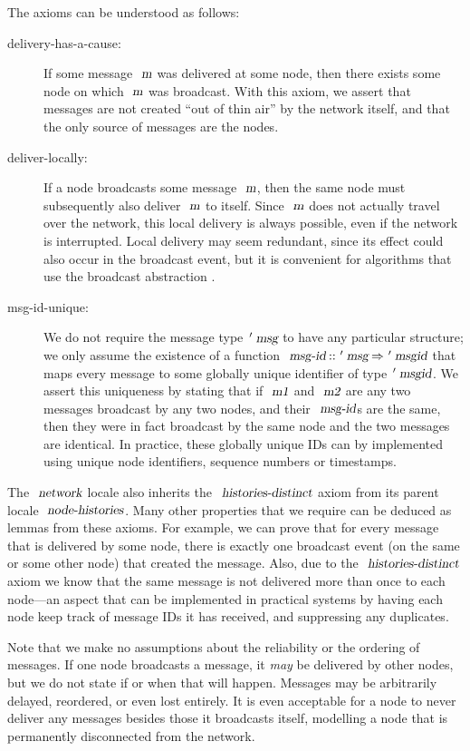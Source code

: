 The axioms can be understood as follows:
\begin{description}
    \item[delivery-has-a-cause:] If some message $\isa{m}$ was delivered at some node, then there exists some node on which $\isa{m}$ was broadcast.
        With this axiom, we assert that messages are not created ``out of thin air'' by the network itself, and that the only source of messages are the nodes.
    \item[deliver-locally:] If a node broadcasts some message $\isa{m}$, then the same node must subsequently also deliver $\isa{m}$ to itself.
        Since $\isa{m}$ does not actually travel over the network, this local delivery is always possible, even if the network is interrupted.
        Local delivery may seem redundant, since its effect could also occur in the broadcast event, but it is convenient for algorithms that use the broadcast abstraction \cite{Cachin:2011wt}.
    \item[msg-id-unique:] We do not require the message type $\isacharprime\isa{msg}$ to have any particular structure; we only assume the existence of a function $\isa{msg-id} \mathbin{\isacharcolon\isacharcolon} \isacharprime\isa{msg} \mathbin{\isasymRightarrow} \isacharprime\isa{msgid}$ that maps every message to some globally unique identifier of type $\isacharprime\isa{msgid}$.
        We assert this uniqueness by stating that if $\isa{m1}$ and $\isa{m2}$ are any two messages broadcast by any two nodes, and their $\isa{msg-id}$s are the same, then they were in fact broadcast by the same node and the two messages are identical. 
        In practice, these globally unique IDs can by implemented using unique node identifiers, sequence numbers or timestamps.
\end{description}

The $\isa{network}$ locale also inherits the $\isa{histories-distinct}$ axiom from its parent locale $\isa{node-histories}$.
Many other properties that we require can be deduced as lemmas from these axioms.
For example, we can prove that for every message that is delivered by some node, there is exactly one broadcast event (on the same or some other node) that created the message.
Also, due to the $\isa{histories-distinct}$ axiom we know that the same message is not delivered more than once to each node---an aspect that can be implemented in practical systems by having each node keep track of message IDs it has received, and suppressing any duplicates.

Note that we make no assumptions about the reliability or the ordering of messages.
If one node broadcasts a message, it \emph{may} be delivered by other nodes, but we do not state if or when that will happen.
Messages may be arbitrarily delayed, reordered, or even lost entirely.
It is even acceptable for a node to never deliver any messages besides those it broadcasts itself, modelling a node that is permanently disconnected from the network.

